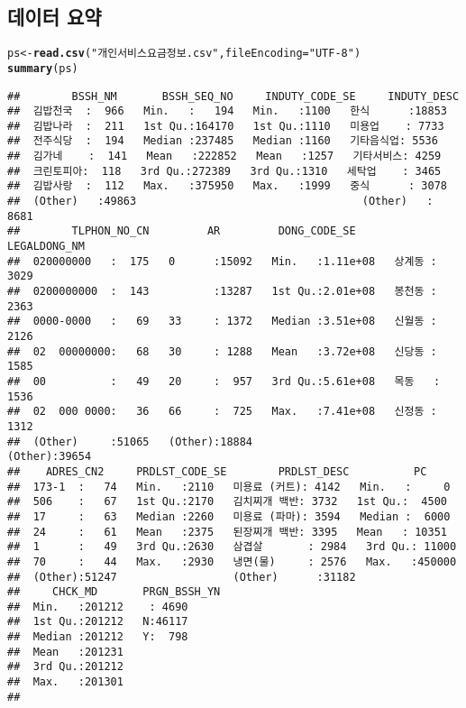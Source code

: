 \documentclass[11pt]{article}\usepackage{graphicx, color}
\makeatletter
\newcommand{\hlfunctioncall}[1]{\textcolor[rgb]{0.501960784313725,0,0.329411764705882}{\textbf{#1}}}%
\newcommand{\hlstring}[1]{\textcolor[rgb]{0.6,0.6,1}{#1}}%
\newenvironment{kframe}{%
 \def\at@end@of@kframe{}%
 \ifinner\ifhmode%
  \def\at@end@of@kframe{\end{minipage}}%
  \begin{minipage}{\columnwidth}%
 \fi\fi%
 \def\FrameCommand##1{\hskip\@totalleftmargin \hskip-\fboxsep
 \colorbox{shadecolor}{##1}\hskip-\fboxsep
     \hskip-\linewidth \hskip-\@totalleftmargin \hskip\columnwidth}%
 \MakeFramed {\advance\hsize-\width
   \@totalleftmargin\z@ \linewidth\hsize
   \@setminipage}}%
 {\par\unskip\endMakeFramed%
 \at@end@of@kframe}
\newenvironment{knitrout}{}{} %
\makeatother
\begin{document}
\subsection{데이터 요약} 
\begin{knitrout}
\color{fgcolor}\begin{kframe}
\begin{alltt}
ps <- \hlfunctioncall{read.csv}(\hlstring{"개인서비스요금정보.csv"}, fileEncoding = \hlstring{"UTF-8"})
\hlfunctioncall{summary}(ps)
\end{alltt}
\begin{verbatim}
##        BSSH_NM       BSSH_SEQ_NO     INDUTY_CODE_SE     INDUTY_DESC   
##  김밥천국  :  966   Min.   :   194   Min.   :1100   한식      :18853  
##  김밥나라  :  211   1st Qu.:164170   1st Qu.:1110   미용업    : 7733  
##  전주식당  :  194   Median :237485   Median :1160   기타음식업: 5536  
##  김가네    :  141   Mean   :222852   Mean   :1257   기타서비스: 4259  
##  크린토피아:  118   3rd Qu.:272389   3rd Qu.:1310   세탁업    : 3465  
##  김밥사랑  :  112   Max.   :375950   Max.   :1999   중식      : 3078  
##  (Other)   :49863                                   (Other)   : 8681  
##        TLPHON_NO_CN         AR         DONG_CODE_SE       LEGALDONG_NM  
##  020000000   :  175   0      :15092   Min.   :1.11e+08   상계동 : 3029  
##  0200000000  :  143          :13287   1st Qu.:2.01e+08   봉천동 : 2363  
##  0000-0000   :   69   33     : 1372   Median :3.51e+08   신월동 : 2126  
##  02  00000000:   68   30     : 1288   Mean   :3.72e+08   신당동 : 1585  
##  00          :   49   20     :  957   3rd Qu.:5.61e+08   목동   : 1536  
##  02  000 0000:   36   66     :  725   Max.   :7.41e+08   신정동 : 1312  
##  (Other)     :51065   (Other):18884                      (Other):39654  
##    ADRES_CN2     PRDLST_CODE_SE        PRDLST_DESC          PC        
##  173-1  :   74   Min.   :2110   미용료 (커트): 4142   Min.   :     0  
##  506    :   67   1st Qu.:2170   김치찌개 백반: 3732   1st Qu.:  4500  
##  17     :   63   Median :2260   미용료 (파마): 3594   Median :  6000  
##  24     :   61   Mean   :2375   된장찌개 백반: 3395   Mean   : 10351  
##  1      :   49   3rd Qu.:2630   삼겹살       : 2984   3rd Qu.: 11000  
##  70     :   44   Max.   :2930   냉면(물)     : 2576   Max.   :450000  
##  (Other):51247                  (Other)      :31182                   
##     CHCK_MD       PRGN_BSSH_YN
##  Min.   :201212    : 4690     
##  1st Qu.:201212   N:46117     
##  Median :201212   Y:  798     
##  Mean   :201231               
##  3rd Qu.:201212               
##  Max.   :201301               
## 
\end{verbatim}
\end{kframe}
\end{knitrout}
\end{document}
